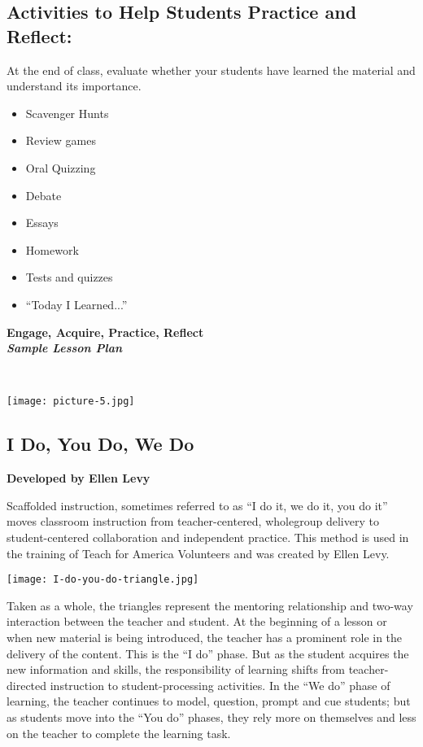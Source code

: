 \subsection{Activities to Help Students Practice and Reflect:}
At the end of class, evaluate whether your students have learned the material and understand its importance.
\begin{itemize}
 \item Scavenger Hunts
 \item Review games
 \item Oral Quizzing
 \item Debate
 \item Essays
 \item Homework
 \item Tests and quizzes
 \item ``Today I Learned...''
\end{itemize}

\newpage
\begin{center}
\textbf{Engage, Acquire, Practice, Reflect\\ \textit{Sample Lesson Plan}}\\
\end{center}
\textbf{\textit{ }}\\

\begin{center}
\texttt{[image: picture-5.jpg]} 
\end{center}

\newpage
\begin{center}
\section{I Do, You Do, We Do}
\textbf{Developed by Ellen Levy}\\
\end{center}

Scaffolded instruction, sometimes referred to as ``I do it, we do it, you do it'' moves classroom instruction from teacher-centered, wholegroup delivery to student-centered collaboration and independent practice.  This method is used in the training of Teach for America Volunteers and was created by Ellen Levy. \\

\begin{center}
\texttt{[image: I-do-you-do-triangle.jpg]} 
\end{center}

Taken as a whole, the triangles represent the mentoring relationship and two-way interaction between the teacher and student. At the beginning of a lesson or when new material is being introduced, the teacher has a prominent role in the delivery of the content. This is the ``I do'' phase. But as the student acquires the new information and skills, the responsibility of learning shifts from teacher-directed instruction to student-processing activities. In the ``We do'' phase of learning, the teacher continues to model, question, prompt and cue students; but as students move into the ``You do'' phases, they rely more on themselves and less on the teacher to complete the learning task.


